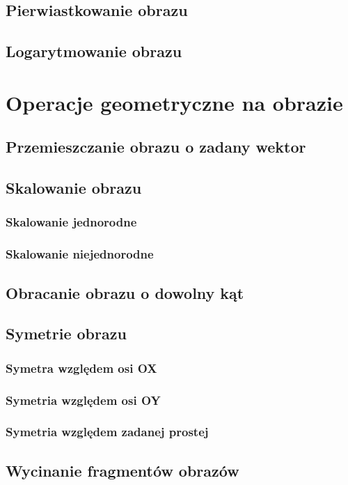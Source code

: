\documentclass[a4paper,12pt, titlepage]{report}
\begin{document}
\section{Pierwiastkowanie obrazu}
\section{Logarytmowanie obrazu}

\chapter{Operacje geometryczne na obrazie}
\section{Przemieszczanie obrazu o zadany wektor}
\section{Skalowanie obrazu}
\subsection{Skalowanie jednorodne}
\subsection{Skalowanie niejednorodne}
\section{Obracanie obrazu o dowolny kąt}
\section{Symetrie obrazu}
\subsection{Symetra względem osi OX}
\subsection{Symetria względem osi OY}
\subsection{Symetria względem zadanej prostej}
\section{Wycinanie fragmentów obrazów}
\end{document}
